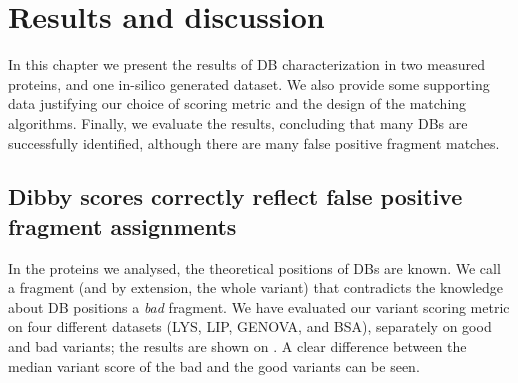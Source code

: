 \chapter{Results and discussion}

In this chapter we present the results of DB characterization in two measured proteins, and one in-silico generated dataset. We also provide some supporting data justifying our choice of scoring metric and the design of the matching algorithms. Finally, we evaluate the results, concluding that many DBs are successfully identified, although there are many false positive fragment matches.

\section{Dibby scores correctly reflect false positive fragment assignments}

In the proteins we analysed, the theoretical positions of DBs are known. We call a fragment (and by extension, the whole variant) that contradicts the knowledge about DB positions a \emph{bad} fragment. We have evaluated our variant scoring metric on four different datasets (LYS, LIP, GENOVA, and BSA), separately on good and bad variants; the results are shown on . A clear difference between the median variant score of the bad and the good variants can be seen.

